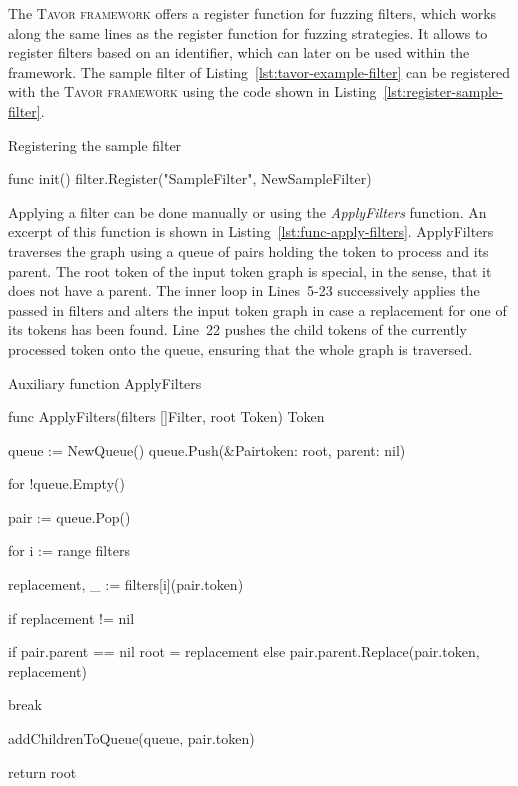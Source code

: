 The \textsc{Tavor framework} offers a register function for fuzzing filters, which works along the same lines as the register function for fuzzing strategies. It allows to register filters based on an identifier, which can later on be used within the framework. The sample filter of Listing~\ref{lst:tavor-example-filter} can be registered with the \textsc{Tavor framework} using the code shown in Listing~\ref{lst:register-sample-filter}.

\begin{listing}[ht]
\caption{Registering the sample filter}
\label{lst:register-sample-filter}
\begin{gocode}
func init() {
	filter.Register("SampleFilter", NewSampleFilter)
}
\end{gocode}
\end{listing}

Applying a filter can be done manually or using the \emph{ApplyFilters} function. An excerpt of this function is shown in Listing~\ref{lst:func-apply-filters}. ApplyFilters traverses the graph using a queue of pairs holding the token to process and its parent. The root token of the input token graph is special, in the sense, that it does not have a parent. The inner loop in Lines~5-23 successively applies the passed in filters and alters the input token graph in case a replacement for one of its tokens has been found. Line~22 pushes the child tokens of the currently processed token onto the queue, ensuring that the whole graph is traversed.

\begin{listing}
\caption{Auxiliary function ApplyFilters}
\label{lst:func-apply-filters}
\begin{gocode}
func ApplyFilters(filters []Filter, root Token) Token {
	queue := NewQueue()
	queue.Push(&Pair{token: root, parent: nil})

	for !queue.Empty() {
		pair := queue.Pop()

		for i := range filters {
			replacement, _ := filters[i](pair.token)

			if replacement != nil {
				if pair.parent == nil {
					root = replacement
				} else {
					pair.parent.Replace(pair.token, replacement)
				}

				break
			}
		}

		addChildrenToQueue(queue, pair.token)
	}

	return root
}
\end{gocode}
\end{listing}

